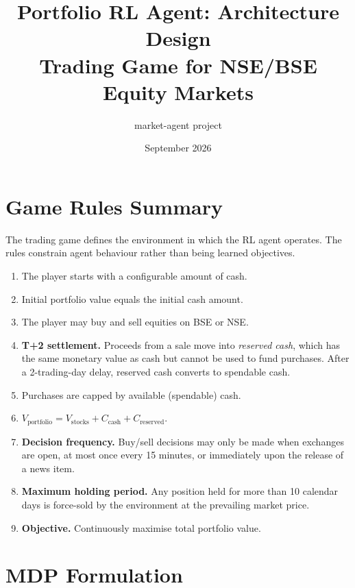 \documentclass[11pt, a4paper]{article}
\title{\textbf{Portfolio RL Agent: Architecture Design}\\[0.5em]
       \large Trading Game for NSE/BSE Equity Markets}
\author{market-agent project}
\date{September 2026}
\begin{document}
\maketitle
\tableofcontents
\newpage

\section{Game Rules Summary}

The trading game defines the environment in which the RL agent operates.
The rules constrain agent behaviour rather than being learned objectives.

\begin{enumerate}[leftmargin=*, label=\textbf{\arabic*.}]
    \item The player starts with a configurable amount of cash.
    \item Initial portfolio value equals the initial cash amount.
    \item The player may buy and sell equities on BSE or NSE.
    \item \textbf{T+2 settlement.} Proceeds from a sale move into \emph{reserved cash},
          which has the same monetary value as cash but cannot be used to fund
          purchases. After a 2-trading-day delay, reserved cash converts to
          spendable cash.
    \item Purchases are capped by available (spendable) cash.
    \item $V_\text{portfolio} = V_\text{stocks} + C_\text{cash} + C_\text{reserved}$.
    \item \textbf{Decision frequency.} Buy/sell decisions may only be made when
          exchanges are open, at most once every 15 minutes, or immediately upon
          the release of a news item.
    \item \textbf{Maximum holding period.} Any position held for more than 10 calendar
          days is force-sold by the environment at the prevailing market price.
    \item \textbf{Objective.} Continuously maximise total portfolio value.
\end{enumerate}

\section{MDP Formulation}
\end{document}
